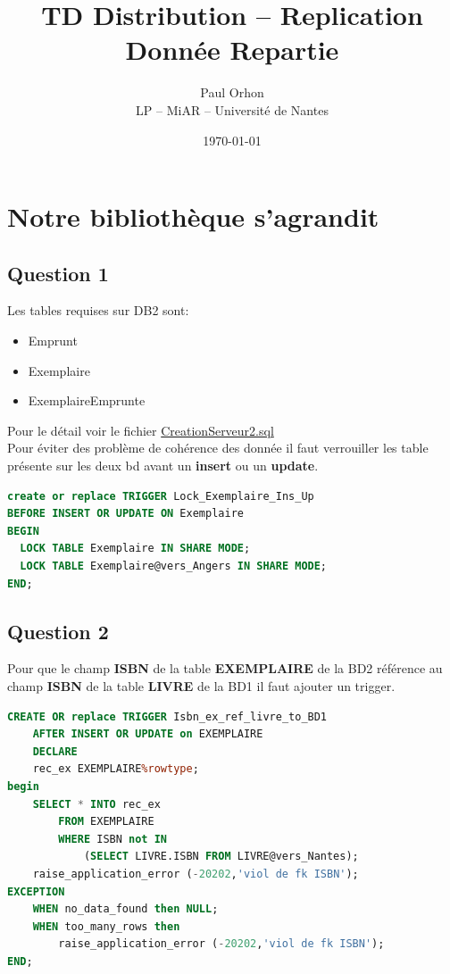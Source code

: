 \documentclass{article}
\title{\huge{TD Distribution – Replication}\\
\normalsize Donnée Repartie}
\date{\today}
\author{Paul Orhon \\
\small LP -- MiAR -- Université de Nantes }
\begin{document}
\maketitle
\tableofcontents

\clearpage

\section{Notre bibliothèque s'agrandit}
\subsection{Question 1}
Les tables requises sur DB2 sont:
\begin{itemize}
    \item Emprunt
    \item Exemplaire
    \item ExemplaireEmprunte
\end{itemize}
Pour le détail voir le fichier \href{https://github.com/paul604/donnees-reparties/blob/master/DISTRIBUTION-REPLICATION/CreationServeur2.sql}{CreationServeur2.sql}
\\

Pour éviter des problème de cohérence des donnée il faut verrouiller les table présente sur les deux bd avant un \textbf{insert} ou un \textbf{update}.
\begin{lstlisting}[language=SQL, caption= Trigger lock Exemplaire]
create or replace TRIGGER Lock_Exemplaire_Ins_Up
BEFORE INSERT OR UPDATE ON Exemplaire 
BEGIN
  LOCK TABLE Exemplaire IN SHARE MODE;
  LOCK TABLE Exemplaire@vers_Angers IN SHARE MODE;
END;
\end{lstlisting}

\subsection{Question 2}
Pour que le champ \textbf{ISBN} de la table \textbf{EXEMPLAIRE} de la BD2 référence au champ \textbf{ISBN} de la table \textbf{LIVRE} de la BD1 il faut ajouter un trigger.

\label{lst:1}
\begin{lstlisting}[language=SQL, caption= Trigger]
CREATE OR replace TRIGGER Isbn_ex_ref_livre_to_BD1
    AFTER INSERT OR UPDATE on EXEMPLAIRE
    DECLARE
    rec_ex EXEMPLAIRE%rowtype;
begin
    SELECT * INTO rec_ex
        FROM EXEMPLAIRE 
        WHERE ISBN not IN
            (SELECT LIVRE.ISBN FROM LIVRE@vers_Nantes);
    raise_application_error (-20202,'viol de fk ISBN'); 
EXCEPTION
    WHEN no_data_found then NULL;
    WHEN too_many_rows then
        raise_application_error (-20202,'viol de fk ISBN');
END;
\end{lstlisting}
\end{document}
